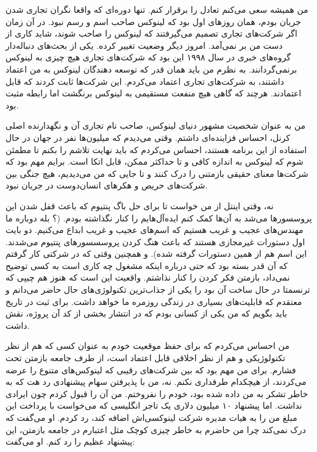 من همیشه سعی می‌کنم تعادل را برقرار کنم. تنها دوره‌ای که واقعا نگران
تجاری شدن جریان بودم، همان روزهای اول بود که لینوکس صاحب اسم و رسم
نبود. در آن زمان اگر شرکت‌های تجاری تصمیم می‌گیرفتند که لینوکس را صاحب
شوند، شاید کاری از دست من بر نمی‌آمد. امروز دیگر وضعیت تغییر کرده. یکی
از بحث‌های دنباله‌دار گروه‌های خبری در سال ۱۹۹۸ این بود که شرکت‌های تجاری
هیچ چیزی به لینوکس برنمی‌گردانند. به نظرم من باید همان قدر که توسعه
دهندگان لینوکس به من اعتماد داشتند، به شرکت‌های تجاری اعتماد
می‌کردم. این شرکت‌ها ثابت کردند که قابل اعتمادند. هرچند که گاهی هیچ
منفعت مستقیمی به لینوکس برنگشت اما رابطه مثبت بود.

من به عنوان شخصیت مشهور دنیای لینوکس، صاحب نام تجاری آن و نگهدارنده
اصلی کرنل، احساس فزاینده‌ای داشتم. وقتی می‌دیدم که میلیون‌ها نفر در جهان
در حال استفاده از این برنامه هستند، احساس می‌کردم که باید نهایت تلاشم
را بکنم تا مطمئن شوم که لینوکس به اندازه کافی و تا حداکثر ممکن، قابل
اتکا است. برایم مهم بود که شرکت‌ها معنای حقیقی بازمتنی را درک کنند و تا
جایی که من می‌دیدیم، هیچ جنگی بین شرکت‌های حریص و هکرهای انسان‌دوست در
جریان نبود.

نه، وقتی اینتل از من خواست تا برای حل باگ  پنتیوم که باعث
قفل شدن این پروسسورها می‌شد به آن‌ها کمک کنم ایده‌آل‌هایم را کنار نگذاشته
بودم. (؟ بله دوباره ما مهندس‌های عجیب
و غریب هستیم که اسم‌های عجیب و غریب ابداع می‌کنیم.  دو بایت
اول دستورات غیرمجازی هستند که باعث هنگ کردن پروسسسورهای پنتیوم
می‌شدند. این اسم هم از همین دستورات گرفته شده). و همچنین وقتی که در
شرکتی کار گرفتم که آن قدر بسته بود که حتی درباره اینکه مشغول چه کاری
است به کسی توضیح نمی‌داد، بازمتن فکر کردن را کنار نذاشتم. واقعیت این
است که هنوز هم چیپی که ترنسمتا در حال ساخت آن بود را یکی از جذاب‌ترین
تکنولوژی‌های حال حاضر می‌دانم و معتقدم که قابلیت‌های بسیاری در زندگی
روزمره ما خواهد داشت. برای ثبت در تاریخ باید بگویم که من یکی از کسانی
بودم که در انتشار بخشی از کد آن پروژه، نقش داشت.

من احساس می‌کردم که برای حفظ موقعیت خودم به عنوان کسی که هم از نظر
تکنولوژیکی و هم از نظر اخلاقی قابل اعتماد است، از طرف جامعه بازمتن تحت
فشارم. برای من مهم بود که بین شرکت‌های رقیبی که لینوکس‌های متنوع را عرضه
می‌کردند، از هیچکدام طرفداری نکنم. نه، من با پذیرفتن سهام پیشنهادی رد
هت که به خاطر تشکر به من داده شده بود، خودم را نفروختم. من آن را قبول
کردم چون ایرادی نداشت. اما پیشنهاد ۱۰ میلیون دلاری یک تاجر انگلیسی که
می‌خواست با پرداخت این مبلغ من را به هیات مدیره شرکت لینوکسی‌اش اضافه
کند، رد کردم. او می‌گفت که درک نمی‌کند چرا من حاضرم به خاطر چیزی کوچک
مثل اعتبارم در جامعه بازمتن، این پیشنهاد عظیم را رد کنم. او می‌گفت:

